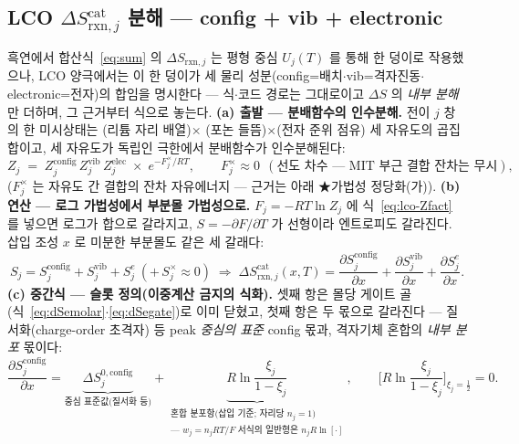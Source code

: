 \documentclass[11pt,a4paper]{article}
\newcommand{\rxn}{\mathrm{rxn}}
\begin{document}
\subsection{LCO $\Delta S_{\rxn,j}^\mathrm{cat}$ 분해 — config + vib + electronic}\label{sec:lco-decomp}
흑연에서 합산식~\eqref{eq:sum} 의 $\Delta S_{\rxn,j}$ 는 평형 중심 $U_j(T)$ 를 통해 한 덩이로 작용했으나, LCO 양극에서는 이 한 덩이가 세 물리 성분(config=배치$\cdot$vib=격자진동$\cdot$electronic=전자)의 합임을 명시한다 — 식$\cdot$코드 경로는 그대로이고 $\Delta S$ 의 \emph{내부 분해}만 더하며, 그 근거부터 식으로 놓는다. \textbf{(a) 출발 — 분배함수의 인수분해.} 전이 $j$ 창의 한 미시상태는 (리튬 자리 배열)$\times$
(포논 들뜸)$\times$(전자 준위 점유) 세 자유도의 곱집합이고, 세 자유도가 독립인 극한에서 분배함수가
인수분해된다:
\begin{equation}
Z_j\;=\;Z_j^\mathrm{config}\,Z_j^\mathrm{vib}\,Z_j^\mathrm{elec}\;\times\;e^{-F_j^{\times}/RT},
\qquad F_j^{\times}\approx0\ \ (\text{선도 차수 — MIT 부근 결합 잔차는 무시}),
\label{eq:lco-Zfact}
\end{equation}
($F_j^{\times}$ 는 자유도 간 결합의 잔차 자유에너지 — 근거는 아래 ★가법성 정당화(가)). \textbf{(b) 연산 — 로그
가법성에서 부분몰 가법성으로.} $F_j=-RT\ln Z_j$ 에 식~\eqref{eq:lco-Zfact} 를 넣으면 로그가 합으로
갈라지고, $S=-\partial F/\partial T$ 가 선형이라 엔트로피도 갈라진다. 삽입 조성 $x$ 로 미분한 부분몰도
같은 세 갈래다:
\begin{equation}
S_j=S_j^\mathrm{config}+S_j^\mathrm{vib}+S_j^{e}\ (+\,S_j^{\times}\!\approx\!0)
\;\Longrightarrow\;
\Delta S_{\rxn,j}^\mathrm{cat}(x,T)=\frac{\partial S_j^\mathrm{config}}{\partial x}
+\frac{\partial S_j^\mathrm{vib}}{\partial x}
+\frac{\partial S_j^{e}}{\partial x}.
\label{eq:lco-Sadd}
\end{equation}
\textbf{(c) 중간식 — 슬롯 정의(이중계산 금지의 식화).} 셋째 항은 몰당 게이트 골
(식~\eqref{eq:dSemolar}$\cdot$\eqref{eq:dSegate})로 이미 닫혔고, 첫째 항은 두 몫으로 갈라진다 —
질서화(charge-order 초격자) 등 peak \emph{중심의 표준} config 몫과, 격자기체 혼합의 \emph{내부 분포}
몫이다:
\begin{equation}
\frac{\partial S_j^\mathrm{config}}{\partial x}
=\underbrace{\Delta S_j^{0,\mathrm{config}}}_{\text{중심 표준값(질서화 등)}}
+\underbrace{R\ln\frac{\xi_j}{1-\xi_j}}_{\substack{\text{혼합 분포항(삽입 기준; 자리당 }n_j{=}1\text{)}\\ \text{— }w_j{=}n_jRT/F\text{ 서식의 일반형은 }n_jR\ln[\cdot]}},
\qquad
\Big[R\ln\frac{\xi_j}{1-\xi_j}\Big]_{\xi_j=\frac12}=0.
\label{eq:lco-configsplit}
\end{equation}
\end{document}

